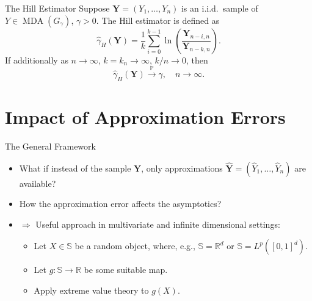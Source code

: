 \documentclass[11pt, aspectratio=169]{beamer}
\DeclareMathOperator{\mda}{MDA}
\begin{document}

\begin{frame}{The Hill Estimator \parencite{hill1975,mason1982}}
  Suppose $\bm Y = \left(Y_1, \ldots, Y_n\right)$ is an i.i.d.\ sample of
  $Y\in\mda\left(G_\gamma\right)$, $\gamma > 0$. The Hill estimator is defined
  as
  \begin{equation*}
    \hat\gamma_H\left(\bm Y\right) = \frac{1}{k}\sum_{i = 0}^{k - 1}
    \ln\left(\frac{\bm Y_{n-i,n}}{\bm Y_{n-k,n}}\right).
  \end{equation*}
  \pause
  If additionally as $n\to\infty$, $k = k_n\to\infty$, $k/n\to 0$, then
  \begin{equation*}
    \hat\gamma_H\left(\bm Y\right)\stackrel{\mathbb{P}}{\to} \gamma,
    \quad n\to\infty.
  \end{equation*}
\end{frame}


\section{Impact of Approximation Errors}

\begin{frame}{The General Framework}
  \begin{itemize}
    \item What if instead of the sample $\bm Y$, only approximations $\hat{\bm
    Y} = (\hat Y_1, \ldots, \hat Y_n)$ are available?
    \pause
    \item How the approximation error affects the asymptotics?
    \pause
    \item $\Rightarrow$ Useful approach in multivariate and infinite dimensional
    settings:
    \begin{itemize}
      \item Let $X\in \mathbb{S}$ be a random object, where, e.g., $\mathbb{S} =
      \mathbb{R}^d$ or $\mathbb{S} = L^p([0,1]^d)$.
      \item Let $g:\mathbb{S}\to\mathbb{R}$ be some suitable map.
      \item Apply extreme value theory to $g(X)$.
    \end{itemize}
  \end{itemize}
\end{frame}

\end{document}
